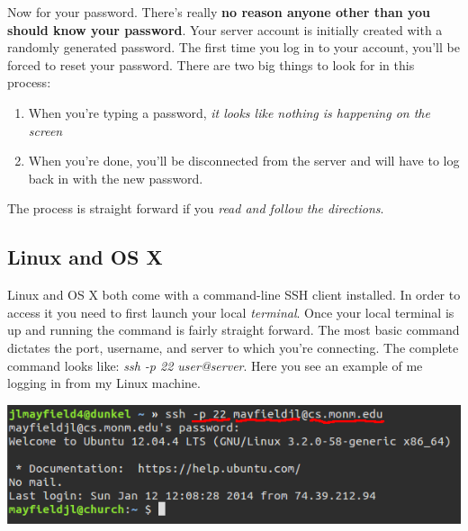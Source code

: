 \documentclass[nobib]{tufte-handout}
\begin{document}
Now for your password. There's really \textbf{no reason anyone other than you should know your password}.  Your server account is initially created with a randomly generated password.  The first time you log in to your account, you'll be forced to reset your password. There are two big things to look for in this process:
\begin{enumerate}
\item When you're typing a password, \textit{it looks like nothing is happening on the screen}
\item When you're done, you'll be disconnected from the server and will have to log back in with the new password.
\end{enumerate}
The process is straight forward if you \textit{read and follow the directions}.

\subsection{Linux and OS X}

Linux and OS X both come with a command-line SSH client installed.  In order to access it you need to first launch your local \textit{terminal}. Once your local terminal is up and running the command is fairly straight forward. The most basic command dictates the port, username, and server to which you're connecting. The complete command looks like: \textit{ssh -p 22 user@server}.  Here you see an example of me logging in from my Linux machine.

\vspace{.1in}
\begin{center}
\includegraphics[scale=.5]{linux-sshlogin.png}
\end{center}
\vspace{.1in}
\end{document}
